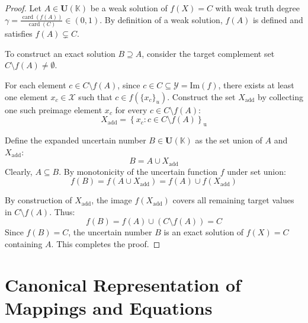 \documentclass[a4paper,12pt,twoside]{memoir}
\DeclareMathOperator{\card}{card}
\newcommand{\set}[1]{\left\{#1\right\}} %
\newcommand{\s}[1]{\set{#1}_\mathrm{u}} %
\newcommand{\tsbd}[1]{\mathbf{U}(\mathbb{#1})}
\begin{document}
	\begin{proof}
		Let $A \in \tsbd{K}$ be a weak solution of $f(X) = C$ with weak truth degree $\gamma = \frac{\card(f(A))}{\card(C)} \in (0, 1)$. By definition of a weak solution, $f(A)$ is defined and satisfies $f(A) \subsetneq C$.
		
		To construct an exact solution $B \supseteq A$, consider the target complement set $C \setminus f(A) \neq \emptyset$.
		
		For each element $c \in C \setminus f(A)$, since $c \in C \subseteq \mathcal{Y} = \text{Im}(f)$, there exists at least one element $x_c \in \mathcal{X}$ such that $c \in f(\{x_c\}_u)$. Construct the set $X_{\text{add}}$ by collecting one such preimage element $x_c$ for every $c \in C \setminus f(A)$:
		\[
		X_{\text{add}} = \s{x_c : c \in C \setminus f(A)}
		\]
		
		Define the expanded uncertain number $B \in \tsbd{K}$ as the set union of $A$ and $X_{\text{add}}$:
		\[
		B = A \cup X_{\text{add}}
		\]
		Clearly, $A \subseteq B$. By monotonicity of the uncertain function $f$ under set union:
		\[
		f(B) = f(A \cup X_{\text{add}}) = f(A) \cup f(X_{\text{add}})
		\]
		
		By construction of $X_{\text{add}}$, the image $f(X_{\text{add}})$ covers all remaining target values in $C \setminus f(A)$. Thus:
		\[
		f(B) = f(A) \cup (C \setminus f(A)) = C
		\]
		Since $f(B) = C$, the uncertain number $B$ is an exact solution of $f(X) = C$ containing $A$. This completes the proof.
	\end{proof}
	
	\section{Canonical Representation of Mappings and Equations}
	
\end{document}
